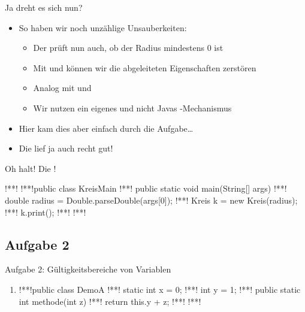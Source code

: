 \iffull
\begin{frame}{Ja dreht es sich nun?}
    \begin{itemize}[<+(1)->]
        \itemsep6pt
        \item So haben wir noch unzählige Unsauberkeiten: \begin{itemize}
            \item Der  prüft nun auch, ob der Radius mindestens \(0\) ist 
            \item Mit  und  können wir die abgeleiteten Eigenschaften zerstören
            \item Analog mit  und 
            \item Wir nutzen ein eigenes  und nicht Javas -Mechanismus
        \end{itemize}
        \item Hier kam dies aber einfach durch die Aufgabe\ldots
        \item Die lief ja auch recht gut!
    \end{itemize}
\end{frame}
\fi

\begin{frame}[fragile,c]{Oh halt! Die !}
\begin{plainjava}
!**!
!**!public class KreisMain {
!**!   public static void main(String[] args) {
!**!       double radius = Double.parseDouble(args[0]);
!**!       Kreis k = new Kreis(radius);
!**!       k.print();
!**!   }
!**!}
\end{plainjava}
\end{frame}

\subsection{Aufgabe 2}
{\taskenum
\begin{frame}[fragile]{Aufgabe 2: Gültigkeitsbereiche von Variablen}
\begin{enumerate}[<+(1)->]
    \item {}
\begin{plainjava}
!**!public class DemoA {
!**!    static int x = 0;
!**!    int y = 1;
!**!    public static int methode(int z){
!**!        return this.y + z;
!**!    }
!**!}
\end{plainjava}
\end{enumerate}
\end{frame}
}

